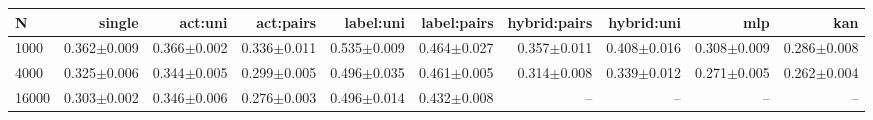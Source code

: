 \begin{tabular}{@{}lrrrrrrrrr@{}}\toprule
N & single & act:uni & act:pairs & label:uni & label:pairs & hybrid:pairs & hybrid:uni & mlp & kan\\\midrule
1000 & 0.362$\pm$0.009 & 0.366$\pm$0.002 & 0.336$\pm$0.011 & 0.535$\pm$0.009 & 0.464$\pm$0.027 & 0.357$\pm$0.011 & 0.408$\pm$0.016 & 0.308$\pm$0.009 & 0.286$\pm$0.008\\
4000 & 0.325$\pm$0.006 & 0.344$\pm$0.005 & 0.299$\pm$0.005 & 0.496$\pm$0.035 & 0.461$\pm$0.005 & 0.314$\pm$0.008 & 0.339$\pm$0.012 & 0.271$\pm$0.005 & 0.262$\pm$0.004\\
16000 & 0.303$\pm$0.002 & 0.346$\pm$0.006 & 0.276$\pm$0.003 & 0.496$\pm$0.014 & 0.432$\pm$0.008 & -- & -- & -- & --\\
\bottomrule\end{tabular}